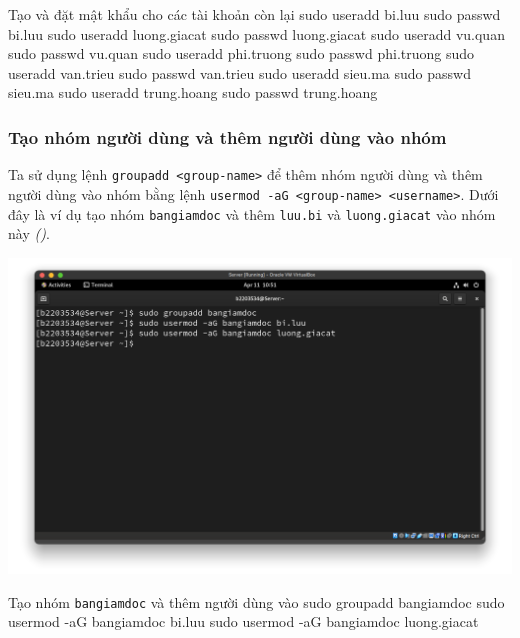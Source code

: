 \vspace{0.5cm}
\begin{bashlisting}{Tạo và đặt mật khẩu cho các tài khoản còn lại}
  sudo useradd bi.luu
  sudo passwd bi.luu
  sudo useradd luong.giacat
  sudo passwd luong.giacat
  sudo useradd vu.quan
  sudo passwd vu.quan
  sudo useradd phi.truong
  sudo passwd phi.truong
  sudo useradd van.trieu
  sudo passwd van.trieu
  sudo useradd sieu.ma
  sudo passwd sieu.ma
  sudo useradd trung.hoang
  sudo passwd trung.hoang
\end{bashlisting}

\subsubsection{Tạo nhóm người dùng và thêm người dùng vào nhóm}

Ta sử dụng lệnh \texttt{groupadd <group-name>} để thêm nhóm người dùng và thêm người dùng
vào nhóm bằng lệnh \texttt{usermod -aG <group-name> <username>}. Dưới đây là ví dụ tạo
nhóm \texttt{bangiamdoc} và thêm \texttt{luu.bi} và \texttt{luong.giacat} vào
nhóm này \textit{()}.

\begin{minipage}{.93\linewidth}
  \captionsetup{type=figure, skip=-15pt}
  \includegraphics[width=\linewidth]{./imgs/Hinh-14.png}
  \caption{\bfseries Tạo nhóm \texttt{bangiamdoc} và thêm người dùng vào}
  \label{fig:groupadd-bangiamdoc}
\end{minipage}

\vspace{0.5cm}
\begin{bashlisting}{Tạo nhóm \texttt{bangiamdoc} và thêm người dùng vào}
  sudo groupadd bangiamdoc
  sudo usermod -aG bangiamdoc bi.luu
  sudo usermod -aG bangiamdoc luong.giacat
\end{bashlisting}


